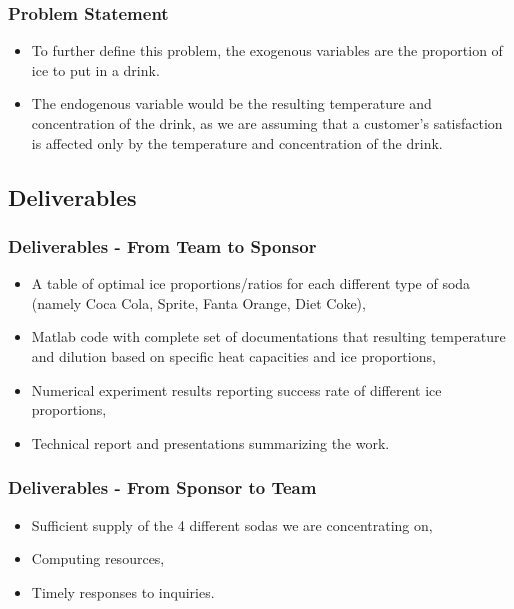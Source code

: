 \documentclass[compress,handout,10pt]{beamer}
\let\olditem\item
\renewcommand{\item}{\setlength{\itemsep}{0.5\baselineskip}\olditem}
\begin{document}
\begin{frame}
    \frametitle{Problem Statement}
     \begin{itemize}
      \item To further define this problem, the exogenous variables are the proportion of ice to put in a drink. 
\item The endogenous variable would be the resulting temperature and concentration of the drink, as we are assuming that a customer's satisfaction is affected only by the temperature and concentration of the drink.
     \end{itemize}
\end{frame}

\subsection{Deliverables}
\begin{frame}
    \frametitle{Deliverables - From Team to Sponsor}


\begin{itemize}
    \item A table of optimal ice proportions/ratios for each different type of soda (namely Coca Cola, Sprite, Fanta Orange, Diet Coke),
    \item Matlab code with complete set of documentations that resulting temperature and dilution based on specific heat capacities and ice proportions,
    \item Numerical experiment results reporting success rate of different ice proportions,
    \item Technical report and presentations summarizing the work. 
\end{itemize}


\end{frame}

\begin{frame}
    \frametitle{Deliverables - From Sponsor to Team}

\begin{itemize}
    \item Sufficient supply of the 4 different sodas we are concentrating on,
    \item Computing resources,
    \item Timely responses to inquiries.
\end{itemize}
\end{frame}
\end{document}
